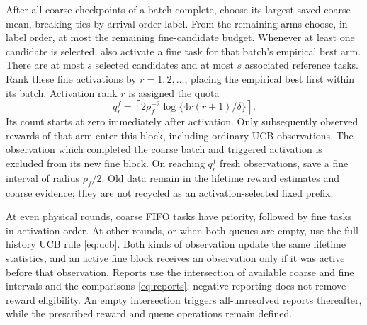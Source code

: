 \documentclass[11pt]{article}
\theoremstyle{remark}
\begin{document}
After all coarse checkpoints of a batch complete, choose its largest
saved coarse mean, breaking ties by arrival-order label. From the
remaining arms choose, in label order, at most the remaining fine-candidate
budget. Whenever at least one candidate is selected, also activate a fine
task for that batch's empirical best arm. There are at most $s$ selected
candidates and at most $s$ associated reference tasks. Rank these fine
activations by $r=1,2,\ldots$, placing the empirical best first within its
batch. Activation rank $r$ is assigned the quota
\[
 q_r^f=\left\lceil2\rho_f^{-2}
                       \log\{4r(r+1)/\delta\}\right\rceil.
\]
Its count starts at zero immediately after activation. Only subsequently
observed rewards of that arm enter this block, including ordinary UCB
observations. The observation which completed the coarse batch and
triggered activation is excluded from its new fine block. On reaching
$q_r^f$ fresh observations, save a fine interval of radius $\rho_f/2$.
Old data remain in the lifetime reward estimates and coarse evidence;
they are not recycled as an activation-selected fixed prefix.

At even physical rounds, coarse FIFO tasks have priority, followed by
fine tasks in activation order. At other rounds, or when both queues
are empty, use the full-history UCB rule \eqref{eq:ucb}. Both kinds of
observation update the same lifetime statistics, and an active fine
block receives an observation only if it was active before that
observation. Reports use the intersection of available coarse and fine
intervals and the comparisons \eqref{eq:reports}; negative reporting
does not remove reward eligibility. An empty intersection triggers
all-unresolved reports thereafter, while the prescribed reward and
queue operations remain defined.
\end{document}
